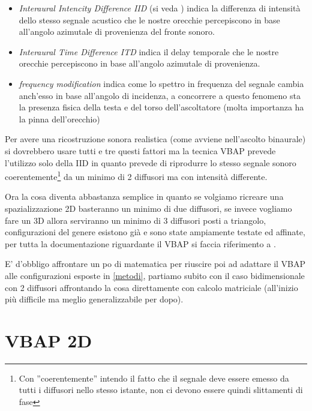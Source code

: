 \documentclass[12pt,a4paper]{report}
\begin{document}
\begin{itemize}
\item \textit{Interaural Intencity Difference IID} (si veda \cite{iid}) indica la differenza di intensità dello stesso segnale acustico che le nostre orecchie percepiscono in base all'angolo azimutale di provenienza del fronte sonoro.
\item \textit{Interaural Time  Difference ITD} indica il delay temporale che le nostre orecchie percepiscono in base all'angolo azimutale di provenienza.
\item \textit{frequency modification} indica come lo spettro in frequenza del segnale cambia anch'esso in base all'angolo di incidenza, a concorrere a questo fenomeno sta la presenza fisica della testa e del torso dell'ascoltatore (molta importanza ha la pinna dell'orecchio)
\end{itemize}

Per avere una ricostruzione sonora realistica (come avviene nell'ascolto binaurale) si dovrebbero usare tutti e tre questi fattori ma la tecnica VBAP prevede l'utilizzo solo della IID in quanto  prevede di riprodurre lo stesso segnale sonoro coerentemente\footnote{Con ''coerentemente'' intendo il fatto che il segnale deve essere emesso da tutti i diffusori nello stesso istante, non ci devono essere quindi slittamenti di fase} da un minimo di 2 diffusori ma con intensità differente.

Ora la cosa diventa abbastanza semplice in quanto se volgiamo ricreare una spazializzazione 2D basteranno un minimo di due diffusori, se invece vogliamo fare un 3D allora serviranno un minimo di 3 diffusori posti a triangolo, configurazioni del genere esistono già e sono state ampiamente testate ed affinate, per tutta la documentazione riguardante il VBAP si faccia riferimento a \cite{vbap}.

E' d'obbligo affrontare un po di matematica per riuscire poi ad adattare il VBAP alle configurazioni esposte in \ref{metodi}, partiamo subito con il caso bidimensionale con 2 diffusori affrontando la cosa direttamente con calcolo matriciale (all'inizio più difficile ma meglio generalizzabile per dopo).

\section{VBAP 2D}\label{c}
\end{document}
